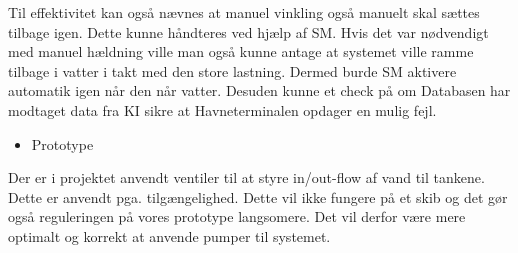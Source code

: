 Til effektivitet kan også nævnes at manuel vinkling også manuelt skal sættes tilbage igen. Dette kunne håndteres ved hjælp af SM. Hvis det var nødvendigt med manuel hældning ville man også kunne antage at systemet ville ramme tilbage i vatter i takt med den store lastning. Dermed burde SM aktivere automatik igen når den når vatter. Desuden kunne et check på om Databasen har modtaget data fra KI sikre at Havneterminalen opdager en mulig fejl.
\begin{large}\begin{itemize}
\item Prototype
\end{itemize}\end{large}
Der er i projektet anvendt ventiler til at styre in/out-flow af vand til tankene. Dette er anvendt pga. tilgængelighed. Dette vil ikke fungere på et skib og det gør også reguleringen på vores prototype langsomere. Det vil derfor være mere optimalt og korrekt at anvende pumper til systemet.